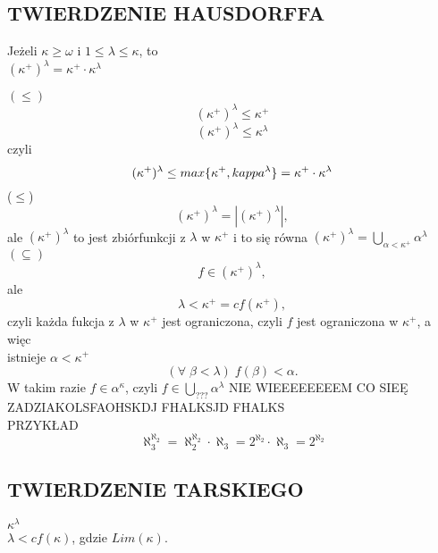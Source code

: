 \subsection{TWIERDZENIE HAUSDORFFA}
\begin{center}\large
    Jeżeli $\kappa\geq \omega$ i $1\leq \lambda\leq\kappa$, to\smallskip\\
    $(\kappa^+)^\lambda=\kappa^+\cdot\kappa^\lambda$
\end{center}\bigskip
\dowod
$(\leq)$\medskip\\
$$(\kappa^+)^\lambda\leq\kappa^+$$
$$(\kappa^+)^\lambda\leq\kappa^\lambda$$
czyli
$$(\kappa^+)^\lambda\leq max\{\kappa^+, \\kappa^\lambda\}=\kappa^+\cdot\kappa^\lambda$$
($\leq$)\medskip\\
$$(\kappa^+)^\lambda=|(\kappa^+)^\lambda|,$$
ale $(\kappa^+)^\lambda$ to jest zbiórfunkcji z $\lambda$ w $\kappa^+$ i to się równa $(\kappa^+)^\lambda=\bigcup\limits_{\alpha<\kappa^+}\alpha^\lambda$
$(\subseteq)$
$$f\in (\kappa^+)^\lambda,$$
ale
$$\lambda<\kappa^+=cf(\kappa^+),$$
czyli każda fukcja z $\lambda$ w $\kappa^+$ jest ograniczona, czyli $f$ jest ograniczona w $\kappa^+$, a więc \\istnieje $\alpha<\kappa^+$
$$(\forall\;\beta<\lambda)\;f(\beta)<\alpha.$$
W takim razie $f\in \alpha^\kappa$, czyli $f\in\bigcup\limits_{???}\alpha^\lambda$
{\color{cyan}NIE WIEEEEEEEEM CO SIEĘ ZADZIAKOLSFAOHSKDJ FHALKSJD FHALKS}\bigskip\\
{\large\color{acc}PRZYKŁAD}
$$\aleph_3^{\aleph_2}=\aleph_2^{\aleph_2}\cdot\aleph_3=2^{\aleph_2}\cdot\aleph_3=2^{\aleph_2}$$

\subsection{TWIERDZENIE TARSKIEGO}
\begin{center}\large
    $\kappa^\lambda$\\
    $\lambda<cf(\kappa)$, gdzie $Lim(\kappa)$.
\end{center}

